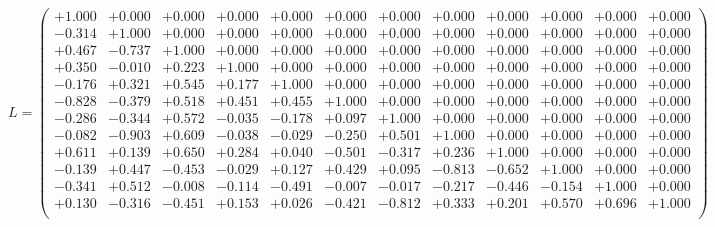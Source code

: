 \documentclass[9pt]{article}
\theoremstyle{plain}
\theoremstyle{definition}
\theoremstyle{remark}
\numberwithin{equation}{section}
\begin{document}
$L = \left(
\begin{array}{
cccccccccccc}
+1.000 & +0.000 & +0.000 & +0.000 & +0.000 & +0.000 & +0.000 & +0.000 & +0.000 & +0.000 & +0.000 & +0.000 \\
-0.314 & +1.000 & +0.000 & +0.000 & +0.000 & +0.000 & +0.000 & +0.000 & +0.000 & +0.000 & +0.000 & +0.000 \\
+0.467 & -0.737 & +1.000 & +0.000 & +0.000 & +0.000 & +0.000 & +0.000 & +0.000 & +0.000 & +0.000 & +0.000 \\
+0.350 & -0.010 & +0.223 & +1.000 & +0.000 & +0.000 & +0.000 & +0.000 & +0.000 & +0.000 & +0.000 & +0.000 \\
-0.176 & +0.321 & +0.545 & +0.177 & +1.000 & +0.000 & +0.000 & +0.000 & +0.000 & +0.000 & +0.000 & +0.000 \\
-0.828 & -0.379 & +0.518 & +0.451 & +0.455 & +1.000 & +0.000 & +0.000 & +0.000 & +0.000 & +0.000 & +0.000 \\
-0.286 & -0.344 & +0.572 & -0.035 & -0.178 & +0.097 & +1.000 & +0.000 & +0.000 & +0.000 & +0.000 & +0.000 \\
-0.082 & -0.903 & +0.609 & -0.038 & -0.029 & -0.250 & +0.501 & +1.000 & +0.000 & +0.000 & +0.000 & +0.000 \\
+0.611 & +0.139 & +0.650 & +0.284 & +0.040 & -0.501 & -0.317 & +0.236 & +1.000 & +0.000 & +0.000 & +0.000 \\
-0.139 & +0.447 & -0.453 & -0.029 & +0.127 & +0.429 & +0.095 & -0.813 & -0.652 & +1.000 & +0.000 & +0.000 \\
-0.341 & +0.512 & -0.008 & -0.114 & -0.491 & -0.007 & -0.017 & -0.217 & -0.446 & -0.154 & +1.000 & +0.000 \\
+0.130 & -0.316 & -0.451 & +0.153 & +0.026 & -0.421 & -0.812 & +0.333 & +0.201 & +0.570 & +0.696 & +1.000 \\
\end{array}
\right)$ \newline 
\end{document}
